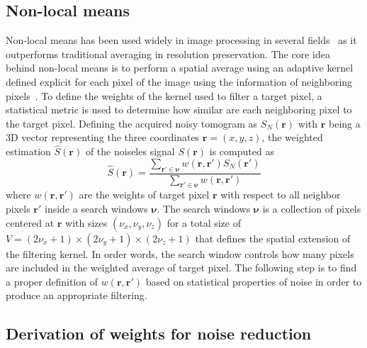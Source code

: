\subsection{Non-local means}

Non-local means has been used widely in image processing in several fields~\cite{Deledalle2015_NLSAR,Lu2012_Nonlocal,Yu2016_Probabilitybased,Coupe2008_Optimized} as it outperforms traditional averaging in resolution preservation. The core idea behind non-local means is to perform a spatial average using an adaptive kernel defined explicit for each pixel of the image using the information of neighboring pixels~\cite{Cuartas-Velez2018_Volumetric}. To define the weights of the kernel used to filter a target pixel, a statistical metric is used to determine how similar are each neighboring pixel to the target pixel. Defining the acquired noisy tomogram as $S_N(\bm{r})$ with $\bm{r}$ being a 3D vector representing the three coordinates $\bm{r}=(x,y,z)$, the weighted estimation $\hat{S}(\bm{r})$ of the noiseles signal $S(\bm{r})$ is computed as
\begin{equation}\label{eq:NLM}
    \hat{S}(\mathbf{r}) = \frac{\sum_{\bm{r}'\in \bm{\nu}} w(\bm{r}, \bm{r}') S_N(\bm{r}')}{\sum_{\bm{r}'\in \bm{\nu}} w(\bm{r}, \bm{r}')}
\end{equation}
where $w(\bm{r}, \bm{r}')$ are the weights of target pixel $\bm{r}$ with respect to all neighbor pixels $\bm{r}'$ inside a search windows $\bm{\nu}$. The search windows $\bm{\nu}$ is a collection of pixels centered at $\bm{r}$ with sizes $(\nu_x, \nu_y, \nu_z)$ for a total size of $V=(2\nu_x+1)\times(2\nu_y+1)\times(2\nu_z+1)$ that defines the spatial extension of the filtering kernel. In order words, the search window controls how many pixels are included in the weighted average of target pixel. The following step is to find a proper definition of $w(\bm{r}, \bm{r}')$ based on statistical properties of noise in order to produce an appropriate filtering.

\subsection{Derivation of weights for noise reduction}

